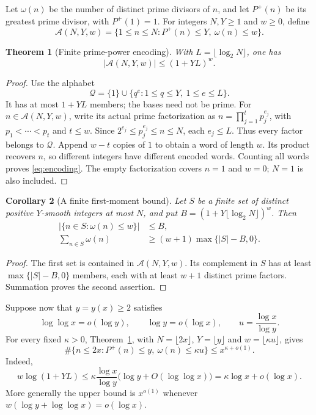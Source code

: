 \documentclass[11pt]{amsart}
\newtheorem{theorem}{Theorem}[section]
\newtheorem{corollary}[theorem]{Corollary}
\theoremstyle{definition}
\theoremstyle{remark}
\newcommand{\loglog}{\log\log}
\begin{document}
Let $\omega(n)$ be the number of distinct prime divisors of $n$, and let
$P^+(n)$ be its greatest prime divisor, with $P^+(1)=1$.
For integers $N,Y\ge1$ and $w\ge0$, define
\[
 \mathcal A(N,Y,w)=
 \{1\le n\le N:P^+(n)\le Y,\ \omega(n)\le w\}.
\]

\begin{theorem}[Finite prime-power encoding]\label{thm:encoding}
With $L=\lfloor\log_2N\rfloor$, one has
\begin{equation}\label{eq:encoding}
 |\mathcal A(N,Y,w)|\le(1+YL)^w.
\end{equation}
\end{theorem}
\begin{proof}
Use the alphabet
\[
 \mathcal Q=\{1\}\cup\{q^e:1\le q\le Y,\ 1\le e\le L\}.
\]
It has at most $1+YL$ members; the bases need not be prime.
For $n\in\mathcal A(N,Y,w)$, write its actual prime factorization as
$n=\prod_{j=1}^t p_j^{e_j}$, with $p_1<\cdots<p_t$ and $t\le w$.
Since $2^{e_j}\le p_j^{e_j}\le n\le N$, each $e_j\le L$.
Thus every factor belongs to $\mathcal Q$. Append $w-t$ copies of $1$ to
obtain a word of length $w$. Its product recovers $n$, so different integers
have different encoded words. Counting all words proves \eqref{eq:encoding}.
The empty factorization covers $n=1$ and $w=0$; $N=1$ is also included.
\end{proof}

\begin{corollary}[A finite first-moment bound]\label{cor:moment}
Let $S$ be a finite set of distinct positive $Y$-smooth integers at most
$N$, and put $B=(1+Y\lfloor\log_2N\rfloor)^w$. Then
\begin{align}
 |\{n\in S:\omega(n)\le w\}|&\le B,\label{eq:lowcount}\\
 \sum_{n\in S}\omega(n)&\ge(w+1)\max\{|S|-B,0\}.
 \label{eq:momentfinite}
\end{align}
\end{corollary}
\begin{proof}
The first set is contained in $\mathcal A(N,Y,w)$. Its complement in $S$
has at least $\max\{|S|-B,0\}$ members, each with at least $w+1$ distinct
prime factors. Summation proves the second assertion.
\end{proof}

Suppose now that $y=y(x)\ge2$ satisfies
\begin{equation}\label{eq:yscale}
 \loglog x=o(\log y),\qquad \log y=o(\log x),
 \qquad u=\frac{\log x}{\log y}.
\end{equation}
For every fixed $\kappa>0$, Theorem~\ref{thm:encoding}, with
$N=\lfloor2x\rfloor$, $Y=\lfloor y\rfloor$ and
$w=\lfloor\kappa u\rfloor$, gives
\begin{equation}\label{eq:global-low}
 \#\{n\le2x:P^+(n)\le y,\ \omega(n)\le\kappa u\}
 \le x^{\kappa+o(1)}.
\end{equation}
Indeed,
\[
 w\log(1+YL)
 \le\kappa\frac{\log x}{\log y}
       \bigl(\log y+O(\loglog x)\bigr)
 =\kappa\log x+o(\log x).
\]
More generally the upper bound is $x^{o(1)}$ whenever
$w(\log y+\loglog x)=o(\log x)$.
\end{document}
